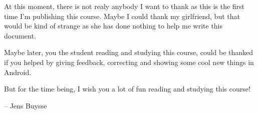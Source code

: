 At this moment, there is not realy anybody I want to thank as this is the first time I'm publishing this course. Maybe I could thank my girlfriend, but that would be kind of strange as she has done nothing to help me write this document. 

Maybe later, you the student reading and studying this course, could be thanked if you helped by giving feedback, correcting and showing some cool new things in Android. 

But for the time being, I wish you a lot of fun reading and studying this course!

\begin{flushright}
	-- Jens Buysse
\end{flushright}